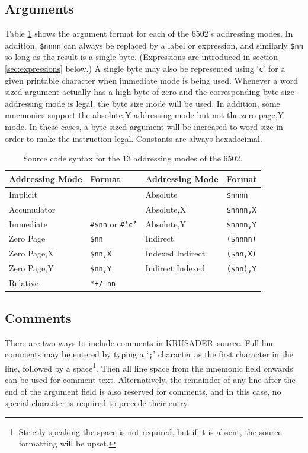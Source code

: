 \documentclass[12pt]{article}
\newcommand{\krusader}{\textsf{KRUSADER}}
\begin{document}
\subsection{Arguments}

Table \ref{tab:addmodes} shows the argument format for each of the 6502's addressing modes.
In addition, \texttt{\$nnnn} can always be replaced by a label or expression, and
similarly \texttt{\$nn} so long as the result is a single byte.  (Expressions are introduced in section \ref{sec:expressions} below.)
A single byte
may also be represented using `\texttt{c}' for a given printable character
when immediate mode is being used.
Whenever a word sized argument actually has a high byte of zero and the corresponding byte size 
addressing mode is legal, the byte size mode will be used.  
In addition, some mnemonics support the absolute,Y addressing mode but not the zero page,Y mode.  
In these cases, a byte sized argument will be increased to word size in order to make the
instruction legal.  
Constants are always hexadecimal.

\begin{table}[htb]
	\centering
	\begin{tabular}{|l|p{2.5cm}||l|p{2.5cm}|} \hline
	\textbf{Addressing Mode} & \textbf{Format} & \textbf{Addressing Mode} & \textbf{Format} \tabularnewline
	\hline
	Implicit & & Absolute & \texttt{\$nnnn} \tabularnewline\hline
	Accumulator & & Absolute,X & \texttt{\$nnnn,X} \tabularnewline\hline
	Immediate & \texttt{\#\$nn} or \texttt{\#'c'} & Absolute,Y & \texttt{\$nnnn,Y}\tabularnewline\hline
	Zero Page & \texttt{\$nn} & Indirect & \texttt{(\$nnnn)}\tabularnewline\hline
	Zero Page,X & \texttt{\$nn,X}  & Indexed Indirect & \texttt{(\$nn,X)}\tabularnewline\hline
	Zero Page,Y & \texttt{\$nn,Y} & Indirect Indexed & \texttt{(\$nn),Y}  \tabularnewline\hline
	Relative & \texttt{*+/-nn} & & \tabularnewline
	\hline
	\end{tabular}
	\caption{Source code syntax for the 13 addressing modes of the 6502.}
	\label{tab:addmodes}
\end{table}

\subsection{Comments}
There are two ways to include comments in \krusader\ source.  Full line comments may be 
entered by typing a `\texttt{;}' character as the first character in the line, followed
by a space\footnote{Strictly speaking the space is not required, but if it is absent,
the source formatting will be upset.}.  
Then all line space from the mnemonic field onwards can be used for comment text.
Alternatively, the remainder of any line after the end of the argument 
field is also reserved for comments, and in this case, no special character is 
required to precede their entry.
\end{document}
